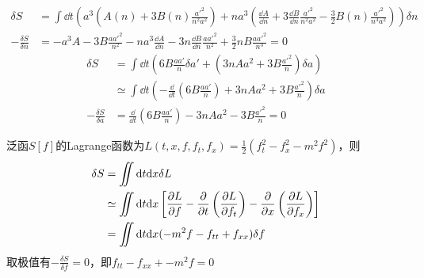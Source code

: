 \begin{solution}
    \[
        \begin{aligned}
            \delta S & = \int \dd t \left(a^3\left(A(n) + 3B(n) \frac{a'^2}{n^2 a^2}\right) + n a^3 \left(\frac{\dd A}{\dd n} + 3\frac{\dd B}{\dd n}\frac{a'^2}{n^2 a^2} - \frac{3}{2}B(n)\frac{a'^2}{n^3 a^2}\right)\right) \delta n\\
            -\frac{\delta S}{\delta n} & = -a^3 A - 3B \frac{a a'^2}{n^2} - n a^3 \frac{\dd A}{\dd n} - 3n \frac{\dd B}{\dd n} \frac{a a'^2}{n^2} + \frac{3}{2}nB\frac{a a'^2}{n^3} = 0
        \end{aligned}
    \]
    \[
        \begin{aligned}
            \delta S & = \int \dd t \left(6 B \frac{a a'}{n} \delta a' + \left(3 n A a^2 + 3 B \frac{a'^2}{n}\right)\delta a\right) \\
            & \simeq \int \dd t \left(- \frac{\dd}{\dd t}\left(6 B \frac{a a'}{n}\right) + 3 n A a^2 + 3 B \frac{a'^2}{n}\right) \delta a \\
            - \frac{\delta S}{\delta a} & = \frac{\dd}{\dd t}\left(6 B \frac{a a'}{n}\right) - 3 n A a^2 - 3 B \frac{a'^2}{n} = 0
        \end{aligned}
    \]
\end{solution}

\begin{solution}
    泛函\(S[f]\)的Lagrange函数为\(L(t,x,f,f_t,f_x) = \frac12(f_t^2-f_x^2-m^2f^2)\)，则
    \[
    \begin{aligned}
        \delta S & = \iint \dd t \dd x \delta L \\
                 & \simeq \iint \dd t \dd x \left[
                    \frac{\partial L}{\partial f} - \frac{\partial}{\partial t}\left( \frac{\partial L}{\partial f_t} \right) - \frac{\partial}{\partial x}\left( \frac{\partial L}{\partial f_x} \right)
                    \right] \\
                 & = \iint \dd t \dd x  
                 (-m^2f - f_{tt} + f_{xx})
                 \delta f
    \end{aligned}
    \]
    取极值有\(-\frac{\delta S}{\delta f}=0\)，即\(f_{tt} - f_{xx} + -m^2f = 0\)
\end{solution}

